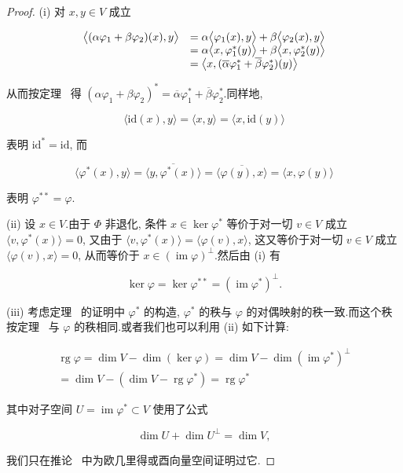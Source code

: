 \begin{proof}
(i) 对 $x, y \in V$ 成立

\[
\begin{array}{r l}
\bigl\langle (\alpha \varphi_1 + \beta \varphi_2)(x), y \bigr\rangle & = \alpha \bigl\langle \varphi_1(x), y \bigr\rangle + \beta \bigl\langle \varphi_2(x), y \bigr\rangle \\
& = \alpha \bigl\langle x, \varphi_1^*(y) \bigr\rangle + \beta \bigl\langle x, \varphi_2^*(y) \bigr\rangle \\
& = \bigl\langle x, (\overline{\alpha} \varphi_1^* + \overline{\beta} \varphi_2^*)(y) \bigr\rangle
\end{array}
\]

从而按定理~ 得 $(\alpha \varphi_1 + \beta \varphi_2)^* = \overline{\alpha} \varphi_1^* + \overline{\beta} \varphi_2^*$.同样地,

\[
\bigl\langle \mathrm{id}(x), y \bigr\rangle = \bigl\langle x, y \bigr\rangle = \bigl\langle x, \mathrm{id}(y) \bigr\rangle
\]

表明 $\mathrm{id}^* = \mathrm{id}$, 而

\[
\bigl\langle \varphi^*(x), y \bigr\rangle = \overline{\bigl\langle y, \varphi^*(x) \bigr\rangle} = \overline{\bigl\langle \varphi(y), x \bigr\rangle} = \bigl\langle x, \varphi(y) \bigr\rangle
\]

表明 $\varphi^{**} = \varphi$.

(ii) 设 $x \in V$.由于 $\varPhi$ 非退化, 条件 $x \in \ker \varphi^*$ 等价于对一切 $v \in V$ 成立 $\langle v, \varphi^*(x) \rangle = 0$, 又由于 $\langle v, \varphi^*(x) \rangle = \langle \varphi(v), x \rangle$, 这又等价于对一切 $v \in V$ 成立 $\langle \varphi(v), x \rangle = 0$, 从而等价于 $x \in (\operatorname{im} \varphi)^{\perp}$.然后由 (i) 有

\[
\ker \varphi = \ker \varphi^{**} = (\operatorname{im} \varphi^*)^{\perp}\text{.}
\]

(iii) 考虑定理~ 的证明中 $\varphi^*$ 的构造, $\varphi^*$ 的秩与 $\varphi$ 的对偶映射的秩一致.而这个秩按定理~ 与 $\varphi$ 的秩相同.或者我们也可以利用 (ii) 如下计算:

\[
\begin{array}{c}
\operatorname{rg} \varphi = \dim V - \dim(\ker \varphi) = \dim V - \dim(\operatorname{im} \varphi^*)^{\perp} \\
= \dim V - (\dim V - \operatorname{rg} \varphi^*) = \operatorname{rg} \varphi^*
\end{array}
\]

其中对子空间 $U = \operatorname{im} \varphi^* \subset V$ 使用了公式

\[
\dim U + \dim U^{\perp} = \dim V,
\]

我们只在推论~ 中为欧几里得或酉向量空间证明过它.
\end{proof}


